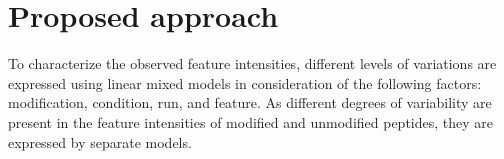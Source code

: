 \documentclass{mcp}
\begin{document}
%
%


\section{Proposed approach}
\label{sec:prop}

To characterize the observed feature intensities, different levels of variations are expressed using linear mixed models in consideration of the following factors: modification, condition, run, and feature. As different degrees of variability are present in the feature intensities of modified and unmodified peptides, they are expressed by separate models.
\end{document}
